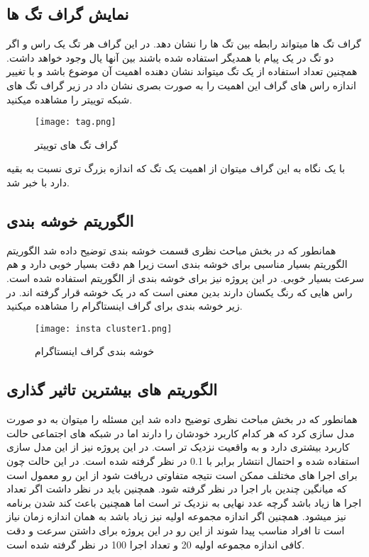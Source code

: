 \documentclass[12pt]{article}
\begin{document}
\subsection{نمایش گراف تگ ها}
گراف تگ ها ميتواند رابطه بين تگ ها را نشان دهد. در اين گراف هر تگ يک راس و اگر دو تگ در 
يک پيام با همديگر استفاده شده باشند بين آنها يال وجود خواهد داشت. همچنين تعداد استفاده از يک تگ 
ميتواند نشان دهنده اهميت آن موضوع باشد و با تغيير اندازه راس های گراف اين اهميت را به صورت
بصری نشان داد در زير گراف تگ های شبکه توييتر را مشاهده ميکنيد.

\begin{figure}[htbp]
\centering
\texttt{[image: tag.png]}
\caption{گراف تگ های توییتر}
\end{figure}

با يک نگاه به اين گراف ميتوان از اهميت يک تگ که اندازه بزرگ تری نسبت به بقيه دارد با خبر شد.


\subsection{الگوریتم خوشه بندی}
همانطور که در بخش مباحث نظری قسمت خوشه بندی توضیح داده شد الگوریتم 
الگوریتم بسیار مناسبی برای خوشه بندی است زیرا هم دقت بسیار خوبی دارد و هم سرعت بسیار خوبی.
در این پروژه نیز برای خوشه بندی از الگوریتم 
استفاده شده است.
راس هایی که رنگ یکسان دارند بدین معنی است که در یک خوشه قرار گرفته اند.
در زیر خوشه بندی برای گراف اینستاگرام را مشاهده میکنید.
\begin{figure}[htbp]
\centering
\texttt{[image: insta cluster1.png]}
\caption{خوشه بندی گراف اینستاگرام}
\end{figure}
\newpage


\subsection{الگوریتم های بیشترین تاثیر گذاری}

همانطور که در بخش مباحث نظری توضيح داده شد اين مسئله را ميتوان به دو صورت مدل سازی کرد که هر کدام 
کاربرد خودشان را دارند اما در شبکه های اجتماعی حالت 
 کاربرد بيشتری دارد و به 
واقعيت نزديک تر است. در اين پروژه نيز از اين مدل سازی استفاده شده و احتمال انتشار برابر با 0.1 در 
نظر گرفته شده است.
در اين حالت چون برای اجرا های مختلف ممکن است نتيجه متفاوتی دريافت شود از اين رو معمول است 
که ميانگين چندين بار اجرا در نظر گرفته شود. همچنين بايد در نظر داشت اگر تعداد اجرا ها زياد باشد 
گرچه عدد نهايی به 
نزديک تر است اما همچنين باعث کند شدن برنامه نيز ميشود. همچنين 
اگر اندازه مجموعه اوليه نيز زياد باشد به همان اندازه زمان نياز است تا افراد مناسب پيدا شوند از اين رو 
در اين پروژه برای داشتن سرعت و دقت کافی اندازه مجموعه اوليه 20 و تعداد اجرا 100 در نظر گرفته 
شده است. 
\end{document}
